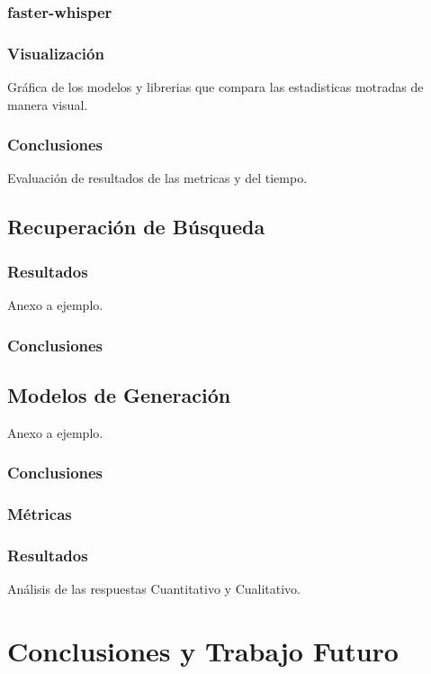 \documentclass{../../prgrado}
\begin{document}
\subsection{faster-whisper}
\subsection{Visualización}
Gráfica de los modelos y librerias que compara las estadisticas motradas de manera visual.

\subsection{Conclusiones}
Evaluación de resultados de las metricas y del tiempo. 



\section{Recuperación de Búsqueda}
\subsection{Resultados}
Anexo a ejemplo.

\subsection{Conclusiones}

\section{Modelos de Generación}
Anexo a ejemplo.


\subsection{Conclusiones}

\subsection{Métricas}
\subsection{Resultados}
Análisis de las respuestas
Cuantitativo y Cualitativo.



\chapter{Conclusiones y Trabajo Futuro}
\end{document}
